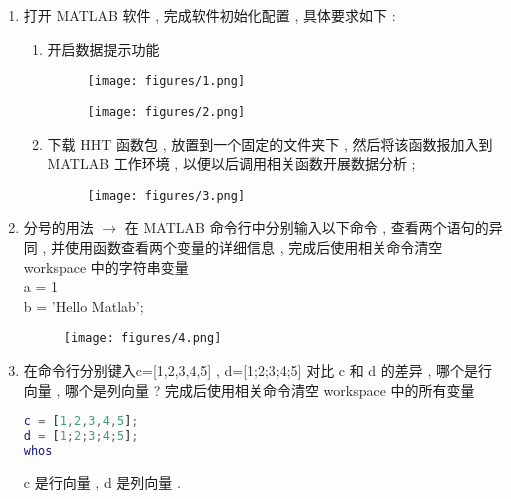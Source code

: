 \documentclass{rsreport}
\begin{document}
    \maketitle
    \begin{enumerate}
        \item 打开 MATLAB 软件 , 完成软件初始化配置 , 具体要求如下 : 
        \begin{enumerate}
            \item 开启数据提示功能
            \begin{figure}[htp]
            \centering
                \texttt{[image: figures/1.png]}
            \end{figure}
            \begin{figure}[htp]
                \centering
                    \texttt{[image: figures/2.png]}
                \end{figure}
            \item 下载 HHT 函数包 , 放置到一个固定的文件夹下 , 然后将该函数报加入到 MATLAB 工作环境 , 以便以后调用相关函数开展数据分析 ; 
            \begin{figure}[htp]
                \centering
                    \texttt{[image: figures/3.png]}
                \end{figure}
        \end{enumerate}
        \item 分号的用法 $ \to $ 在 MATLAB 命令行中分别输入以下命令 , 查看两个语句的异同 , 并使用函数查看两个变量的详细信息 , 完成后使用相关命令清空 workspace 中的字符串变量\\
        a = 1 \\
        b = 'Hello Matlab';
        \begin{figure}[htp]
            \centering
                \texttt{[image: figures/4.png]}
            \end{figure}
        \item 在命令行分别键入c=[1,2,3,4,5] ,  d=[1;2;3;4;5]
        对比 c 和 d 的差异 , 哪个是行向量 , 哪个是列向量 ? 完成后使用相关命令清空 workspace 中的所有变量
        \\
        
        \begin{lstlisting}[language=matlab]
c = [1,2,3,4,5];
d = [1;2;3;4;5];
whos
                    \end{lstlisting}


        \textcolor[rgb]{0,0,1}{c 是行向量 , d 是列向量 . }


\end{enumerate}
\end{document}
